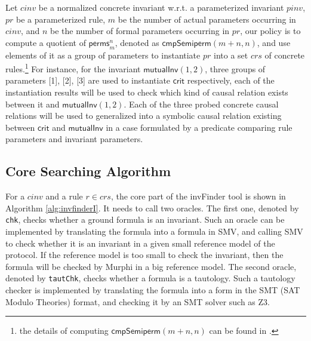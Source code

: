 \documentclass[final]{IEEEtran}
\begin{document}
Let $cinv$  be a normalized concrete invariant w.r.t. a parameterized invariant $pinv$, $pr$ be a parameterized rule, $m$ be the number of actual parameters occurring in $cinv$, and $n$  be the number of formal parameters occurring in $pr$,  our policy is to compute a quotient of $\mathsf{perms}_{m}^{n}$, denoted as $\mathsf{cmpSemiperm}(m+n,n )$, and use elements of it as a group of parameters to instantiate $pr$ into a set $crs$ of concrete rules.\footnote{the details of computing $\mathsf{cmpSemiperm}(m+n,n )$ can be found in \cite{LiCache16}.}  For instance, for the invariant $\mathsf{mutualInv}(1,2)$, three groups of parameters [1], [2], [3] are used to instantiate $\mathsf{crit}$ respectively, each of the instantiation results will be used to check which kind of  causal relation exists between it and $\mathsf{mutualInv}(1,2)$.  Each of the three probed concrete causal relations will be used to generalized  into a symbolic causal relation existing between $\mathsf{crit}$ and $\mathsf{mutualInv}$ in a case formulated by a predicate comparing rule parameters and invariant parameters.  %

\subsection{Core Searching Algorithm}\label{sec:coresearchingAlgorithm}

\vspace{-0.3cm}
For a  $cinv$ and a rule $r \in crs$, the core part of the {\sf invFinder} tool is shown in Algorithm \ref{alg:invfinderI}. It needs to call two oracles. The first one, denoted by {\tt chk}, checks whether a ground formula is an invariant. Such an oracle can be implemented by translating the formula into a formula in SMV, and calling SMV to check whether it is an invariant  in a given small reference model of the protocol. If  the reference model is too small to check the invariant, then the formula will be checked by Murphi in a big reference model.  The second oracle, denoted by {\tt tautChk}, checks whether a formula is a tautology. Such a tautology checker is implemented by translating the formula into a form in the SMT (SAT Modulo Theories) format, and checking it by an SMT solver such as Z3.
\end{document}
